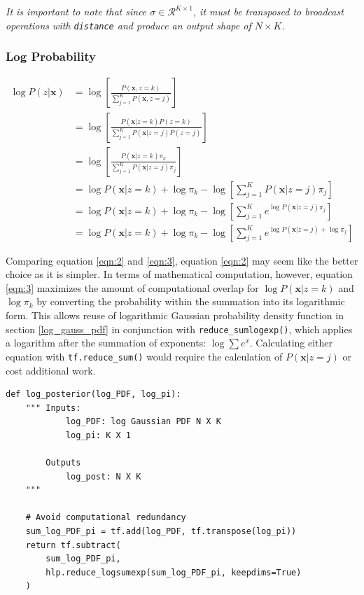 \documentclass[letterpaper]{article}
\begin{document}
\noindent
\textit{It is important to note that since $\sigma \in \mathcal{R}^{K \times 1}$, it must be transposed to broadcast operations with \texttt{distance} and produce an output shape of $N \times K$.}

\newpage

\subsubsection{Log Probability}

\begin{align*}
\log P(z | \textbf{x}) &= \log \left[ \frac{P(\textbf{x}, z = k)}{\sum_{j = 1}^{K} P(\textbf{x}, z = j)} \right] \\
&= 
\log \left[ \frac{P(\textbf{x} | z = k) P(z = k)}{\sum_{j = 1}^{K} P(\textbf{x} | z = j) P(z = j)} \right] \\
&=
\log \left[ \frac{P(\textbf{x} | z = k) \pi_k}{\sum_{j = 1}^{K} P(\textbf{x} | z = j) \pi_j} \right] \\
&= \label{eqn:2} \tag{2}
\log P(\textbf{x} | z = k) + \log \pi_k - \log \left[ \sum_{j = 1}^{K} P(\textbf{x} | z = j) \pi_j \right] \\
&= 
\log P(\textbf{x} | z = k) + \log \pi_k - \log \left[ \sum_{j = 1}^{K} e^{\log P(\textbf{x} | z = j) \pi_j} \right] \\
&= \label{eqn:3} \tag{3}
\log P(\textbf{x} | z = k) + \log \pi_k - \log \left[ \sum_{j = 1}^{K} e^{\log P(\textbf{x} | z = j) + \log \pi_j} \right]
\end{align*}

\noindent
Comparing equation \ref{eqn:2} and \ref{eqn:3}, equation \ref{eqn:2} may seem like the better choice as it is simpler. In terms of mathematical computation, however, equation \ref{eqn:3} maximizes the amount of computational overlap for $\log P(\textbf{x} | z = k)$ and $\log \pi_k$ by converting the probability within the summation into its logarithmic form. This allows reuse of logarithmic Gaussian probability density function in section \ref{log_gauss_pdf} in conjunction with \texttt{reduce\_sumlogexp()}, which applies a logarithm after the summation of exponents: $\log \sum e^{x}$. Calculating either equation with \texttt{tf.reduce\_sum()} would require the calculation of $P(\textbf{x} | z = j)$ or cost additional work. 

\begin{lstlisting}
def log_posterior(log_PDF, log_pi):
    """ Inputs:
            log_PDF: log Gaussian PDF N X K
            log_pi: K X 1

        Outputs
            log_post: N X K
    """
    
    # Avoid computational redundancy
    sum_log_PDF_pi = tf.add(log_PDF, tf.transpose(log_pi))
    return tf.subtract(
        sum_log_PDF_pi,
        hlp.reduce_logsumexp(sum_log_PDF_pi, keepdims=True)
    )
\end{lstlisting}
\end{document}
